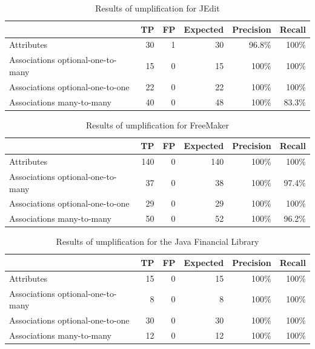 \begin{table}[h]
\caption{Results of umplification for JEdit}
\label{table:umplifiedResultsSystems4}
\centering 
\begin{tabular}{p{4cm}|rrrrr}
\toprule
\rowcolor[HTML]{BBDAFF}
\textbf{} & \textbf{TP}  & \textbf{FP}  & \textbf{Expected} & \textbf{Precision}  & \textbf{Recall}\\ \hline
Attributes & 30  & 1 & 30 & 96.8\% & 100\%\\ \hline
Associations optional-one-to-many & 15  & 0 & 15  & 100\% & 100\% \\ \hline
Associations optional-one-to-one  &  22 & 0 & 22 & 100\% & 100\% \\\hline
Associations many-to-many &  40 & 0 & 48  & 100\% & 83.3\% \\ \bottomrule
\end{tabular}
\end{table}

\begin{table}[h]
\caption{Results of umplification for FreeMaker}
\label{table:umplifiedResultsSystems5}
\centering 
\begin{tabular}{p{4cm}|rrrrr}
\toprule
\rowcolor[HTML]{BBDAFF}
\textbf{} & \textbf{TP}  & \textbf{FP} & \textbf{Expected}  & \textbf{Precision}  & \textbf{Recall}\\ \hline
Attributes & 140  & 0  & 140  & 100\% & 100\% \\ \hline
Associations optional-one-to-many &  37 & 0 & 38 & 100\% & 97.4\% \\\hline
Associations optional-one-to-one &  29 & 0 & 29  & 100\% & 100\% \\ \hline
Associations many-to-many & 50 & 0 & 52 & 100\% & 96.2\%\\ \bottomrule
\end{tabular}
\end{table}

\begin{table}[h]
\caption{Results of umplification for the Java Financial Library}
\label{table:umplifiedResultsSystems6}
\centering 
\begin{tabular}{p{4cm}|rrrrr}
\toprule
\rowcolor[HTML]{BBDAFF}
\textbf{} & \textbf{TP}  & \textbf{FP} & \textbf{Expected}  & \textbf{Precision}  & \textbf{Recall}\\ \hline
Attributes & 15  & 0  & 15  & 100\% & 100\%  \\ \hline
Associations optional-one-to-many &  8 & 0 & 8 & 100\% & 100\%\\\hline
Associations optional-one-to-one &  30 & 0 & 30  & 100\% & 100\% \\ \hline
Associations many-to-many & 12 & 0 & 12 & 100\% & 100\% \\ \bottomrule
\end{tabular}
\end{table}


